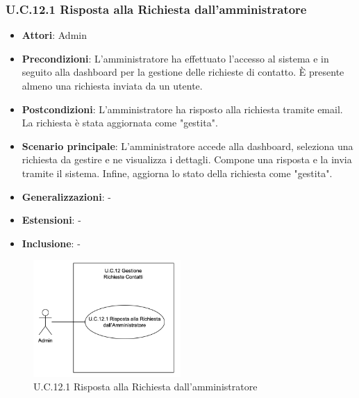 \subsubsection{U.C.12.1 Risposta alla Richiesta dall'amministratore}
\begin{itemize}
    \item \textbf{Attori}: Admin
    \item \textbf{Precondizioni}: L’amministratore ha effettuato l’accesso al sistema e in seguito alla dashboard per la gestione delle richieste di contatto. È presente almeno una richiesta inviata da un utente.
    \item \textbf{Postcondizioni}: L’amministratore ha risposto alla richiesta tramite email. La richiesta è stata aggiornata come "gestita".
    \item \textbf{Scenario principale}: L’amministratore accede alla dashboard, seleziona una richiesta da gestire e ne visualizza i dettagli. Compone una risposta e la invia tramite il sistema. Infine, aggiorna lo stato della richiesta come "gestita".
    \item \textbf{Generalizzazioni}: -
    \item \textbf{Estensioni}: -
    \item \textbf{Inclusione}: -
\end{itemize}
\begin{figure}[H]
    \centering
    \includegraphics[width=0.5\textwidth]{img/UC12-1.png}
    \caption{U.C.12.1 Risposta alla Richiesta dall'amministratore}
\end{figure}
\newpage
